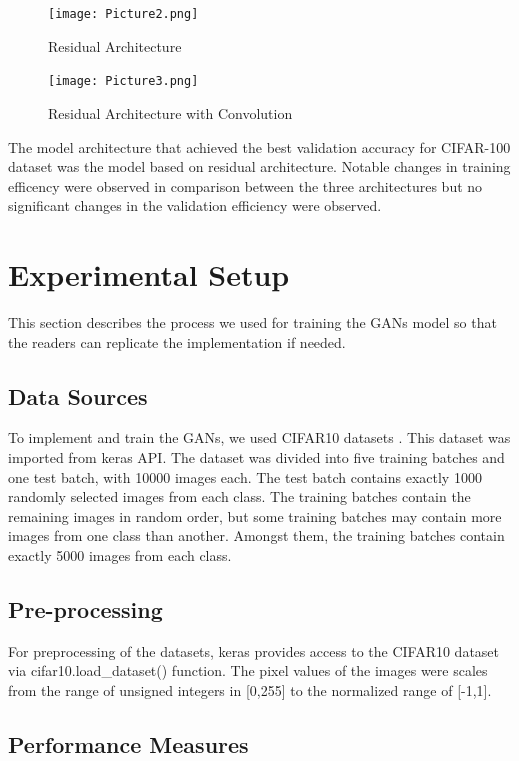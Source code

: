 \documentclass{article}
\begin{document}
\begin{figure}[H]
    \centering
    \texttt{[image: Picture2.png]}
    \caption{Residual Architecture}
    \label{fig:ResidualB}
\end{figure}

\begin{figure}[H]
    \centering
    \texttt{[image: Picture3.png]}
    \caption{Residual Architecture with Convolution}
    \label{fig:ResidualBConv}
\end{figure}


The model architecture that achieved the best validation accuracy for CIFAR-100 dataset was the model based on residual architecture. Notable changes in training efficency were observed in comparison between the three architectures but no significant changes in the validation efficiency were observed.
\fi

\section{Experimental Setup}
This section describes the process we used for training the GANs model so that the readers can replicate the implementation if needed. 
\subsection{Data Sources}
To implement and train the GANs, we used CIFAR10 datasets \cite{kaggle}. This dataset was imported from keras API. The dataset was divided into five training batches and one test batch, with 10000 images each. The test batch contains exactly 1000 randomly selected images from each class. The training batches contain the remaining images in random order, but some training batches may contain more images from one class than another. Amongst them, the training batches contain exactly 5000 images from each class.

\subsection{Pre-processing}
For preprocessing of the datasets, keras provides access to the CIFAR10 dataset via cifar10.load\_dataset() function. The pixel values of the images were scales from the range of unsigned integers in [0,255] to the normalized range of [-1,1]. 

\subsection{Performance Measures}
\end{document}
